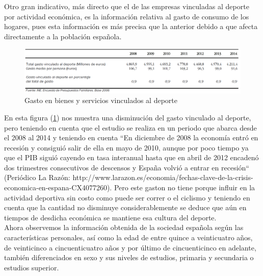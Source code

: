 \documentclass[a4paper, 11pt]{article}
\begin{document}
      Otro gran indicativo, más directo que el de las empresas vinculadas al
      deporte por actividad económica, es la información relativa al gasto de
      consumo de los hogares, pues esta información es más precisa que la anterior
      debido a que afecta directamente a la población española.\\

      \begin{figure}[H]
          \centering
          \includegraphics[width=\textwidth]{Gasto-en-bienes-y-servicios-vinculados-al-deporte}
          \caption{Gasto en bienes y servicios vinculados al deporte}
          \label{f:hogares}
      \end{figure}

      En esta figura (\ref{f:hogares}) nos muestra una disminución del gasto
      vinculado al deporte, pero teniendo en cuenta que el estudio se realiza en
      un periodo que abarca desde el 2008 al 2014 y teniendo en cuenta ``En
      diciembre de 2008 la economía entró en recesión y consiguió salir de ella
      en mayo de 2010, aunque por poco tiempo ya que el PIB siguió cayendo en
      tasa interanual hasta que en abril de 2012 encadenó dos trimestres
      consecutivos de descensos y España volvió a entrar en recesión`` (Periódico
      La Razón: http://www.larazon.es/economia/fechas-clave-de-la-crisis-economica-en-espana-CX4077260).
      Pero este gaston no tiene porque influir en la actividad deportiva sin costo
      como puede ser correr o el ciclismo y teniendo en cuenta que la cantidad
      no disminuye considerablemente se deduce que aún en tiempos de desdicha
      económica se mantiene esa cultura del deporte.\\


      Ahora observemos la información obtenida de la sociedad española según
      las características personales, así como la edad de entre quince a veinticuatro
      años, de veinticinco a cincuenticuatro años y por último de cincuenticinco
      en adelante, también diferenciados en sexo y sus niveles de estudios, primaria
      y secundaria o estudios superior.\\
\end{document}
